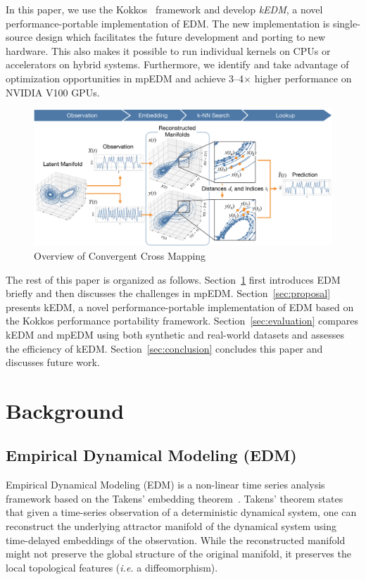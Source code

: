 \documentclass[conference]{IEEEtran}
\begin{document}
In this paper, we use the Kokkos~\cite{Edwards2014} framework and develop
\textit{kEDM}, a novel performance-portable implementation of EDM\@.
The new implementation is single-source design which facilitates the future
development and porting to new hardware. This also makes it possible to run
individual kernels on CPUs or accelerators on hybrid systems. Furthermore, we
identify and take advantage of optimization opportunities in mpEDM and achieve
3--4$\times$ higher performance on NVIDIA V100 GPUs.

\begin{figure}
    \centering
    \includegraphics[width=1.0\linewidth]{figs/xmap_overview}
    \caption{Overview of Convergent Cross Mapping}%
    \label{fig:edm}
\end{figure}

The rest of this paper is organized as follows. Section~\ref{sec:background}
first introduces EDM briefly and then discusses the challenges in mpEDM\@.
Section~\ref{sec:proposal} presents kEDM, a novel performance-portable
implementation of EDM based on the Kokkos performance portability framework.
Section~\ref{sec:evaluation} compares kEDM and mpEDM using both synthetic and
real-world datasets and assesses the efficiency of kEDM\@.
Section~\ref{sec:conclusion} concludes this paper and discusses future work.

\section{Background}\label{sec:background}

\subsection{Empirical Dynamical Modeling (EDM)}\label{sec:edm}

Empirical Dynamical Modeling (EDM) is a non-linear time series analysis
framework based on the Takens' embedding theorem~\cite{Deyle2011}. Takens'
theorem states that given a time-series observation of a deterministic
dynamical system, one can reconstruct the underlying attractor manifold of the
dynamical system using time-delayed embeddings of the observation. While the
reconstructed manifold might not preserve the global structure of the original
manifold, it preserves the local topological features (\textit{i.e.} a
diffeomorphism).
\end{document}
